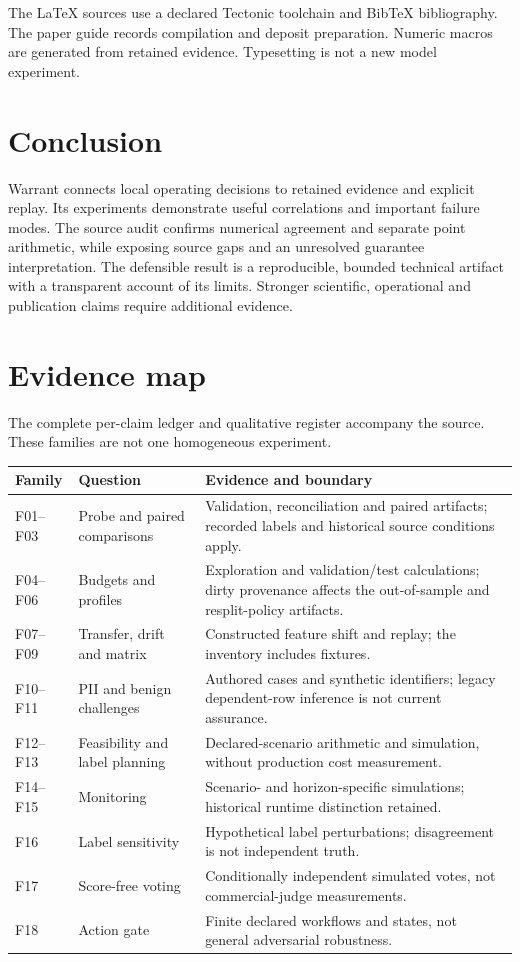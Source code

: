 The LaTeX sources use a declared Tectonic toolchain and BibTeX bibliography.
The paper guide records compilation and deposit preparation. Numeric macros are
generated from retained evidence. Typesetting is not a new model experiment.

\section{Conclusion}
Warrant connects local operating decisions to retained evidence and explicit
replay. Its experiments demonstrate useful correlations and important failure
modes. The source audit confirms numerical agreement and separate point
arithmetic, while exposing source gaps and an unresolved guarantee interpretation.
The defensible result is a reproducible, bounded technical artifact with a
transparent account of its limits. Stronger scientific, operational and
publication claims require additional evidence.

\appendix
\section{Evidence map}
The complete per-claim ledger and qualitative register accompany the source.
These families are not one homogeneous experiment.

\begin{longtable}{@{}>{\raggedright\arraybackslash}p{16mm}>{\raggedright\arraybackslash}p{43mm}>{\raggedright\arraybackslash}p{91mm}@{}}
\toprule
Family&Question&Evidence and boundary\\
\midrule
\endhead
F01--F03&Probe and paired comparisons&Validation, reconciliation and paired
artifacts; recorded labels and historical source conditions apply.\\
F04--F06&Budgets and profiles&Exploration and validation/test calculations;
dirty provenance affects the out-of-sample and resplit-policy artifacts.\\
F07--F09&Transfer, drift and matrix&Constructed feature shift and replay;
the inventory includes fixtures.\\
F10--F11&PII and benign challenges&Authored cases and synthetic identifiers;
legacy dependent-row inference is not current assurance.\\
F12--F13&Feasibility and label planning&Declared-scenario arithmetic and
simulation, without production cost measurement.\\
F14--F15&Monitoring&Scenario- and horizon-specific simulations; historical
runtime distinction retained.\\
F16&Label sensitivity&Hypothetical label perturbations; disagreement is
not independent truth.\\
F17&Score-free voting&Conditionally independent simulated votes, not
commercial-judge measurements.\\
F18&Action gate&Finite declared workflows and states, not general
adversarial robustness.\\
\bottomrule
\end{longtable}


